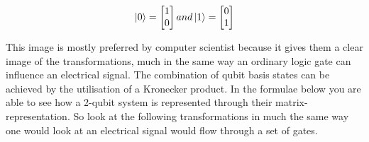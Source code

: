 \[
	\ket{0}=
	\begin{bmatrix}
	1					\\
	0
	\end{bmatrix} 
	and
	\ket{1}=
	\begin{bmatrix}
	0					\\
	1
	\end{bmatrix} 
\]

This image is mostly preferred by computer scientist because it gives them a clear image of the transformations, much in the same way an ordinary logic gate can influence an electrical signal. The combination of qubit basis states can be achieved by the utilisation of a Kronecker product. In the formulae below you are able to see how a 2-qubit system is represented through their matrix-representation. So look at the following transformations in much the same way one would look at an electrical signal would flow through a set of gates.

